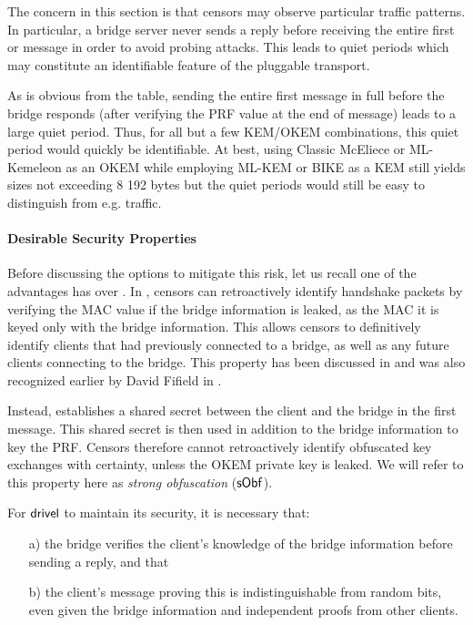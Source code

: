 The concern in this section is that censors may observe particular traffic patterns. In particular, a bridge server never sends a reply before receiving the entire first \drivel{} or \obfsfour{} message in order to avoid probing attacks. This leads to quiet periods which may constitute an identifiable feature of the pluggable transport.

As is obvious from the table, sending the entire first \drivel{} message in full before the bridge responds (after verifying the PRF value at the end of message) leads to a large quiet period. Thus, for all but a few KEM/OKEM combinations, this quiet period would quickly be identifiable. At best, using Classic McEliece or ML-Kemeleon as an OKEM while employing ML-KEM or BIKE as a KEM still yields sizes not exceeding 8 192 bytes but the quiet periods would still be easy to distinguish from e.g. \obfsfour{} traffic.

\paragraph{Desirable Security Properties}
Before discussing the options to mitigate this risk, let us recall one of the advantages \drivel{} has over \obfsfour{}. In \obfsfour{}, censors can retroactively identify handshake packets by verifying the MAC value if the bridge information is leaked, as the MAC it is keyed only with the bridge information. This allows censors to definitively identify clients that had previously connected to a bridge, as well as any future clients connecting to the bridge. This property has been discussed in \cite[Section~6]{CCS:GunSteVei24} and was also recognized earlier by David Fifield in \cite{obfs4-pk-reveal-distinguisher}.

Instead, \drivel{} establishes a shared secret between the client and the bridge in the first message. This shared secret is then used in addition to the bridge information to key the PRF. Censors therefore cannot retroactively identify obfuscated key exchanges with certainty, unless the OKEM private key is leaked. We will refer to this property here as \emph{strong obfuscation} ($\mathsf{sObf}$).

For $\textsf{drivel}$ to maintain its security, it is necessary that:
\begin{itemize}
    \item[a)] the bridge verifies the client's knowledge of the bridge information before sending a reply, and that
    \item[b)] the client's message proving this is indistinguishable from random bits, even given the bridge information and independent proofs from other clients.
\end{itemize}

